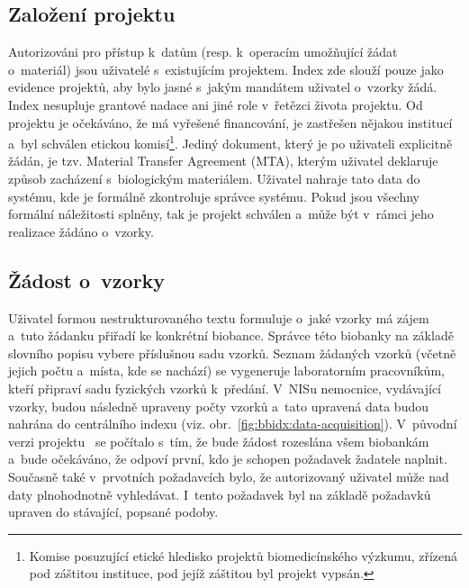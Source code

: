 \subsection{Založení projektu}
Autorizováni pro přístup k~datům (resp. k~operacím umožňující žádat o~materiál) jsou uživatelé s~existujícím projektem. Index zde slouží pouze jako evidence projektů, aby bylo jasné s~jakým mandátem uživatel o~vzorky žádá. Index nesupluje grantové nadace ani jiné role v~řetězci života projektu. Od projektu je očekáváno, že má vyřešené financování, je zastřešen nějakou institucí a~byl schválen etickou komisí\footnote{Komise posuzující etické hledisko projektů biomedicínského výzkumu, zřízená pod záštitou instituce, pod jejíž záštitou byl projekt vypsán.}. Jediný dokument, který je po uživateli explicitně žádán, je tzv. Material Transfer Agreement (MTA), kterým uživatel deklaruje způsob zacházení s~biologickým materiálem. Uživatel nahraje tato data do systému, kde je formálně zkontroluje správce systému. Pokud jsou všechny formální náležitosti splněny, tak je projekt schválen a~může být v~rámci jeho realizace žádáno o~vzorky.

\subsection{Žádost o~vzorky}
Uživatel formou nestrukturovaného textu formuluje o~jaké vzorky má zájem a~tuto žádanku přiřadí ke konkrétní biobance. Správce této biobanky na základě slovního popisu vybere příslušnou sadu vzorků. Seznam žádaných vzorků (včetně jejich počtu a~místa, kde se nachází) se vygeneruje laboratorním pracovníkům, kteří připraví sadu fyzických vzorků k~předání. V~NISu nemocnice, vydávající vzorky, budou následně upraveny počty vzorků a~tato upravená data budou nahrána do centrálního indexu (viz. obr.~\ref{fig:bbidx:data-acquisition}). 
V~původní verzi projektu~\cite{ARCH_2011_12_29} se počítalo s~tím, že bude žádost rozeslána všem biobankám a~bude očekáváno, že odpoví první, kdo je schopen požadavek žadatele naplnit. Současně také v~prvotních požadavcích bylo, že autorizovaný uživatel může nad daty plnohodnotně vyhledávat. I~tento požadavek byl na základě požadavků upraven do stávající, popsané podoby.


